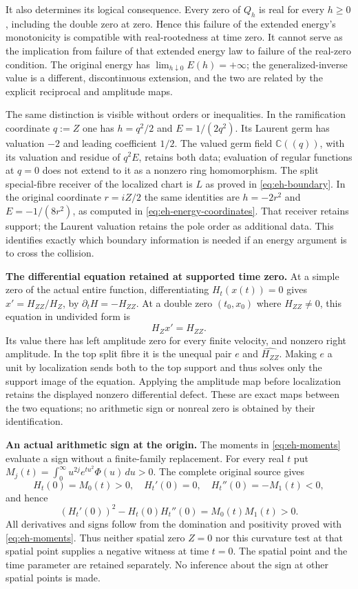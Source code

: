 It also determines its logical consequence. Every zero of $Q_h$ is
real for every $h\ge0$, including the double zero at zero. Hence this
failure of the extended energy's monotonicity is compatible with
real-rootedness at time zero. It cannot serve as the implication from
failure of that extended energy law to failure of the real-zero
condition. The original energy has $\lim_{h\downarrow0}E(h)=+\infty$;
the generalized-inverse value is a different, discontinuous extension,
and the two are related by the explicit reciprocal and amplitude maps.

The same distinction is visible without orders or inequalities. In
the ramification coordinate $q:=Z$ one has $h=q^2/2$ and
$E=1/(2q^2)$. Its Laurent germ has valuation $-2$ and leading
coefficient $1/2$. The valued germ field $\mathbb C((q))$, with its
valuation and residue of $q^2E$, retains both data; evaluation of
regular functions at $q=0$ does not extend to it as a nonzero
ring homomorphism. The split special-fibre receiver of the localized
chart is $L$ as proved in \eqref{eq:eh-boundary}. In the original
coordinate $r=iZ/2$ the same identities are $h=-2r^2$ and
$E=-1/(8r^2)$, as computed in \eqref{eq:eh-energy-coordinates}.
That receiver retains support;
the Laurent valuation retains the pole order as additional data.
This identifies exactly which boundary information is needed if an
energy argument is to cross the collision.

\RD\textbf{The differential equation retained at supported time zero.}
At a simple zero of the actual entire function, differentiating
$H_t(x(t))=0$ gives
$x'=H_{ZZ}/H_Z$, by $\partial_tH=-H_{ZZ}$.
At a double zero $(t_0,x_0)$ where $H_{ZZ}\ne0$, this equation in
undivided form is
\[
 H_Z x'=H_{ZZ}.
\]
Its value there has left amplitude zero for every finite velocity,
and nonzero right amplitude. In the top split fibre it is the
unequal pair $e$ and $\widehat{H_{ZZ}}$. Making $e$ a unit by
localization sends both to the top support and thus solves only
the support image of the equation. Applying the amplitude map
before localization retains the displayed nonzero differential
defect. These are exact maps between the two equations; no
arithmetic sign or nonreal zero is obtained by their identification.

\RD\textbf{An actual arithmetic sign at the origin.}
The moments in \eqref{eq:eh-moments} evaluate a sign without a finite-family
replacement. For every real $t$ put
$M_j(t)=\int_0^\infty u^{2j}e^{tu^2}\Phi(u)\,du>0$.
The complete original source gives
\[
 H_t(0)=M_0(t)>0,\quad H_t'(0)=0,\quad H_t''(0)=-M_1(t)<0,
\]
and hence
\[
 (H_t'(0))^2-H_t(0)H_t''(0)=M_0(t)M_1(t)>0.
\]
All derivatives and signs follow from the domination and positivity
proved with \eqref{eq:eh-moments}. Thus neither spatial zero $Z=0$ nor this curvature
test at that spatial point supplies a negative witness at time $t=0$.
The spatial point and the time parameter are retained separately.
No inference about the sign at other spatial points is made.

